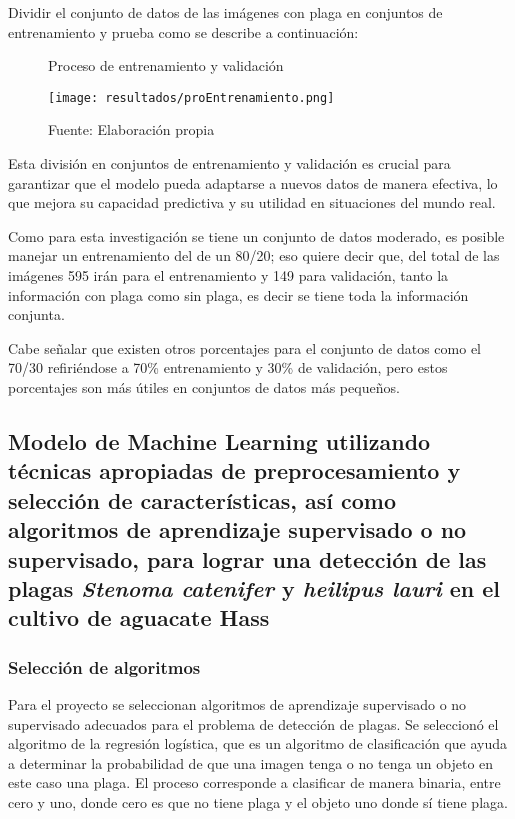 Dividir el conjunto de datos de las imágenes con plaga en conjuntos de entrenamiento y prueba como se describe a continuación:

\begin{figure}[h]
\centering
\caption{Proceso de entrenamiento y validación}
\texttt{[image: resultados/proEntrenamiento.png]}
\caption*{\footnotesize Fuente: Elaboración propia}
\label{fig:figuraProEntrenamiento}
\end{figure}

Esta división en conjuntos de entrenamiento y validación es crucial para garantizar que el modelo pueda adaptarse a nuevos datos de manera efectiva, lo que mejora su capacidad predictiva y su utilidad en situaciones del mundo real.

Como para esta investigación se tiene un conjunto de datos moderado, es posible manejar un entrenamiento del de un 80/20; eso quiere decir que, del total de las imágenes 595 irán para el entrenamiento y 149 para validación, tanto la información con plaga como sin plaga, es decir se tiene toda la información conjunta.

\newpage

Cabe señalar que existen otros porcentajes para el conjunto de datos como el 70/30 refiriéndose a 70\% entrenamiento y 30\% de validación, pero estos porcentajes son más útiles en conjuntos de datos más pequeños.

\subsection{Modelo de Machine Learning utilizando técnicas apropiadas de preprocesamiento y selección de características, así como algoritmos de aprendizaje supervisado o no supervisado, para lograr una detección de las plagas \textit{Stenoma catenifer} y \textit{heilipus lauri} en el cultivo de aguacate Hass}

\subsubsection{Selección de algoritmos}

Para el proyecto se seleccionan algoritmos de aprendizaje supervisado o no supervisado adecuados para el problema de detección de plagas. Se seleccionó el algoritmo de la regresión logística, que es un algoritmo de clasificación que ayuda a determinar la probabilidad de que una imagen tenga o no tenga un objeto en este caso una plaga. El proceso corresponde a clasificar de manera binaria, entre cero y uno, donde cero es que no tiene plaga y el objeto uno donde sí tiene plaga.

